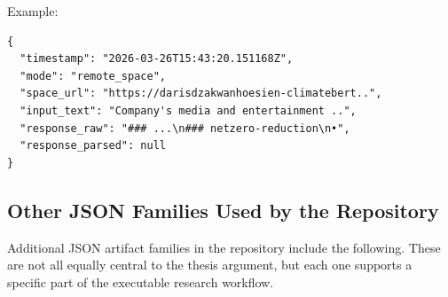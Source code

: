 \documentclass[english, online, cse, master]{dithesis}
\begin{document}
Example:

\begin{verbatim}
{
  "timestamp": "2026-03-26T15:43:20.151168Z",
  "mode": "remote_space",
  "space_url": "https://darisdzakwanhoesien-climatebert..",
  "input_text": "Company's media and entertainment ..",
  "response_raw": "### ...\n### netzero-reduction\n•",
  "response_parsed": null
}
\end{verbatim}

\subsection{Other JSON Families Used by the Repository}\label{other-json-families-used-by-the-repository}

Additional JSON artifact families in the repository include the following. These are not all equally central to the thesis argument, but each one supports a specific part of the executable research workflow.
\end{document}
